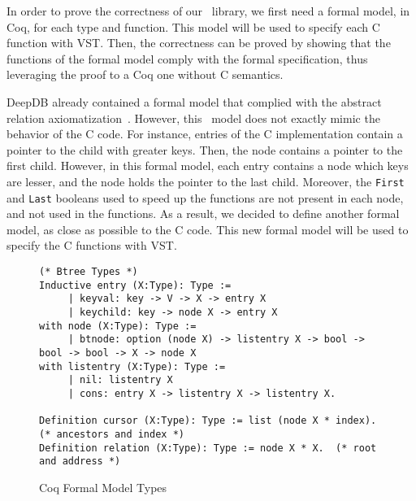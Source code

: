 In order to prove the correctness of our \btrees\ library, we first need a formal model, in Coq, for each type and function.
This model will be used to specify each C function with VST.
Then, the correctness can be proved by showing that the functions of the formal model comply with the formal specification, thus leveraging the proof to a Coq one without C semantics.

DeepDB already contained a formal model that complied with the abstract relation axiomatization~\cite{brian}.
However, this \btree\ model does not exactly mimic the behavior of the C code.
For instance, entries of the C implementation contain a pointer to the child with greater keys.
Then, the node contains a pointer to the first child.
However, in this formal model, each entry contains a node which keys are lesser, and the node holds the pointer to the last child.
Moreover, the \texttt{First} and \texttt{Last} booleans used to speed up the functions are not present in each node, and not used in the functions.
As a result, we decided to define another formal model, as close as possible to the C code.
This new formal model will be used to specify the C functions with VST.


\begin{figure}
\begin{lstlisting}[language=Coq]
(* Btree Types *)
Inductive entry (X:Type): Type :=
     | keyval: key -> V -> X -> entry X
     | keychild: key -> node X -> entry X
with node (X:Type): Type :=
     | btnode: option (node X) -> listentry X -> bool -> bool -> bool -> X -> node X
with listentry (X:Type): Type :=
     | nil: listentry X
     | cons: entry X -> listentry X -> listentry X.

Definition cursor (X:Type): Type := list (node X * index). (* ancestors and index *)
Definition relation (X:Type): Type := node X * X.  (* root and address *)
\end{lstlisting}
\label{coqtypes}
\caption{Coq Formal Model Types}
\end{figure}

